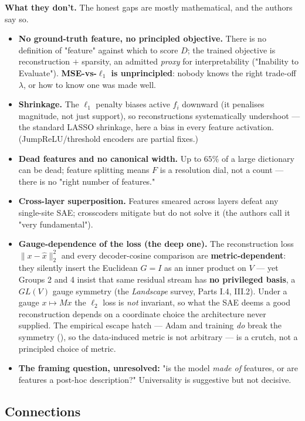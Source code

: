 \textbf{What they don't.} The honest gaps are mostly mathematical, and the authors say so.
\begin{itemize}[leftmargin=1.4em]
\item \textbf{No ground-truth feature, no principled objective.} There is no definition of "feature" against which to score $D$; the trained objective is reconstruction $+$ sparsity, an admitted \emph{proxy} for interpretability ("Inability to Evaluate"). \textbf{MSE-vs-$\ell_1$ is unprincipled}: nobody knows the right trade-off $\lambda$, or how to know one was made well.
\item \textbf{Shrinkage.} The $\ell_1$ penalty biases active $f_i$ downward (it penalises magnitude, not just support), so reconstructions systematically undershoot --- the standard LASSO shrinkage, here a bias in every feature activation. (JumpReLU/threshold encoders are partial fixes.)
\item \textbf{Dead features and no canonical width.} Up to $65\%$ of a large dictionary can be dead; feature splitting means $F$ is a resolution dial, not a count --- there is no "right number of features."
\item \textbf{Cross-layer superposition.} Features smeared across layers defeat any single-site SAE; crosscoders mitigate but do not solve it (the authors call it "very fundamental").
\item \textbf{Gauge-dependence of the loss (the deep one).} The reconstruction loss $\lVert x-\hat x\rVert_2^2$ and every decoder-cosine comparison are \textbf{metric-dependent}: they silently insert the Euclidean $G=I$ as an inner product on $V$ --- yet Groups 2 and 4 insist that same residual stream has \textbf{no privileged basis}, a $GL(V)$ gauge symmetry (the \emph{Landscape} survey, Parts I.4, III.2). Under a gauge $x\mapsto Mx$ the $\ell_2$ loss is \emph{not} invariant, so what the SAE deems a good reconstruction depends on a coordinate choice the architecture never supplied. The empirical escape hatch --- Adam and training \emph{do} break the symmetry (\textcite{privileged-bases-residual-stream}), so the data-induced metric is not arbitrary --- is a crutch, not a principled choice of metric.
\item \textbf{The framing question, unresolved:} "is the model \emph{made of} features, or are features a post-hoc description?" Universality is suggestive but not decisive.
\end{itemize}

\subsection*{Connections}

